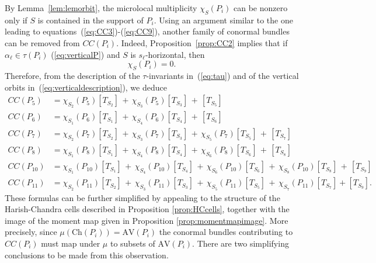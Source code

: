 \documentclass[a4paper, 11pt]{article}
\begin{document}
By Lemma~\ref{lem:lemorbit}, the microlocal multiplicity $\chi_S(P_i)$
can be nonzero only if $S$ is contained in the support of
$P_i$. Using an argument similar to the one leading to
equations~(\ref{eq:CC3})-(\ref{eq:CC9}), another
family of conormal bundles can be removed from $CC(P_i)$.
Indeed, Proposition~\ref{prop:CC2} implies that if $\alpha_{\ell} \in
\tau(P_{i})$  (\ref{eq:verticalP})
and $S$ is $s_{\ell}$-horizontal, then 
$$
\chi_{S}(P_{i})=0.
$$
Therefore, from the description of the $\tau$-invariants
in~(\ref{eq:tau}) and of the vertical orbits
in~(\ref{eq:verticaldescription}),  
we deduce
\begin{align}\label{eq:CCP7CCP11}
CC(P_5)&=\chi^{}_{S_2}(P_5)[T_{S_2}]\, +\, \chi^{}_{S_3}(P_5) [T_{S_3}]\, +\, [T_{S_5}]\nonumber\\
CC(P_6)&=\chi^{}_{S_1}(P_6)[T_{S_1}]\, +\, \chi^{}_{S_4}(P_6)[T_{S_4}]\, +\, [T_{S_6}]\nonumber\\
CC(P_7)&=\chi^{}_{S_2}(P_7)[T_{S_2}]\, +\, \chi^{}_{S_3}(P_7) [T_{S_3}]\, +\, 
\chi^{}_{S_5}(P_7)[T_{S_5}]
\, +\, [T_{S_7}]\\
CC(P_8)&=\chi^{}_{S_1}(P_8)[T_{S_1}]\, +\, \chi^{}_{S_4}(P_8)[T_{S_4}]\, +\, 
\chi^{}_{S_6}(P_8)[T_{S_6}]\, +\, [T^{}_{S_8}]\nonumber\\
CC(P_{10})&=\chi^{}_{S_1}(P_{10})[T_{S_1}]\, +\, \chi^{}_{S_4}(P_{10}) 
[T_{S_4}]\,+\, 
\chi^{}_{S_6}(P_{10})[T_{S_6}]
\, +\, \chi^{}_{S_8}(P_{10}) [T_{S_8}]\, +\, [T_{S_9}]\nonumber\\
CC(P_{11})&=\chi^{}_{S_2}(P_{11})[T_{S_2}]\, +\,
\chi^{}_{S_3}(P_{11})[T_{S_3}]\, +\, \chi^{}_{S_5}(P_{11})[T_{S_5}]\,
+\, \chi^{}_{S_7}(P_{11})[T_{S_7}]+[T_{S_9}].\nonumber 
\end{align}
These formulas can be further simplified by appealing to the structure
of the Harish-Chandra cells described in Proposition
\ref{prop:HCcells}, together with the image of the moment map given in
Proposition \ref{prop:momentmapimage}.  
More precisely,  since $\mu(\mathrm{Ch}(P_i)) = \mathrm{AV}(P_i)$ 
the conormal bundles contributing to $CC(P_i)$ must map under $\mu$ to
subsets of $\mathrm{AV}(P_i)$.   There are two simplifying conclusions
to be made from this observation.
\end{document}
